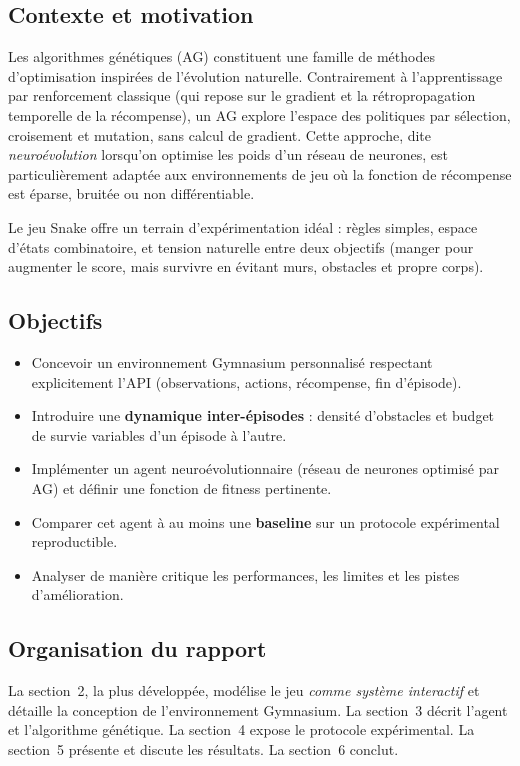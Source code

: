 \documentclass[11pt,a4paper]{article}
\begin{document}
\subsection{Contexte et motivation}
Les algorithmes génétiques (AG) constituent une famille de méthodes
d'optimisation inspirées de l'évolution naturelle. Contrairement à
l'apprentissage par renforcement classique (qui repose sur le gradient et la
rétropropagation temporelle de la récompense), un AG explore l'espace des
politiques par sélection, croisement et mutation, sans calcul de gradient. Cette
approche, dite \emph{neuroévolution} lorsqu'on optimise les poids d'un réseau de
neurones, est particulièrement adaptée aux environnements de jeu où la fonction
de récompense est éparse, bruitée ou non différentiable.

Le jeu Snake offre un terrain d'expérimentation idéal : règles simples, espace
d'états combinatoire, et tension naturelle entre deux objectifs (manger pour
augmenter le score, mais survivre en évitant murs, obstacles et propre corps).

\subsection{Objectifs}
\begin{itemize}[nosep]
  \item Concevoir un environnement Gymnasium personnalisé respectant explicitement
        l'API (observations, actions, récompense, fin d'épisode).
  \item Introduire une \textbf{dynamique inter-épisodes} : densité d'obstacles et
        budget de survie variables d'un épisode à l'autre.
  \item Implémenter un agent neuroévolutionnaire (réseau de neurones optimisé par AG)
        et définir une fonction de fitness pertinente.
  \item Comparer cet agent à au moins une \textbf{baseline} sur un protocole
        expérimental reproductible.
  \item Analyser de manière critique les performances, les limites et les pistes
        d'amélioration.
\end{itemize}

\subsection{Organisation du rapport}
La section~2, la plus développée, modélise le jeu \emph{comme système interactif}
et détaille la conception de l'environnement Gymnasium. La section~3 décrit
l'agent et l'algorithme génétique. La section~4 expose le protocole expérimental.
La section~5 présente et discute les résultats. La section~6 conclut.
\end{document}
